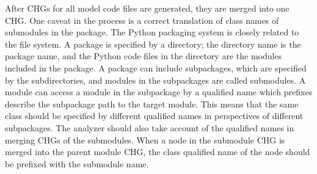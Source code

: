 After CHGs for all model code files are generated, 
they are merged into one CHG.
One caveat in the process is a correct translation of class names
of submodules in the package.
The Python packaging system is closely related to the file system.
A package is specified by a directory; 
the directory name is the package name, 
and the Python code files in the directory are the modules included in the package.
A package can include subpackages, which are specified
by the subdirectories, and modules in the subpackages are called submodules.
A module can access a module in the subpackage by a qualified name
which prefixes describe the subpackage path to the target module.
This means that the same class should be specified by different qualified
names in perspectives of different subpackages.
The analyzer should also take account of the qualified names
in merging CHGs of the submodules. 
When a node in the submodule CHG is merged into the parent module CHG,
the class qualified name of the node should be prefixed with the
submodule name.


